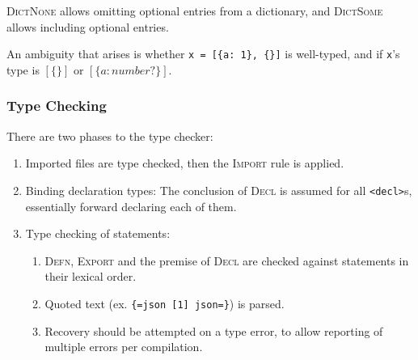 \begin{mathparpagebreakable}




\end{mathparpagebreakable}

\textsc{DictNone} allows omitting optional entries from a dictionary, and
\textsc{DictSome} allows including optional entries.

An ambiguity that arises is whether \texttt{x = [\{a: 1\}, \{\}]} is well-typed,
and if \texttt{x}'s type is $[\{\}]$ or $[\{ a: number? \}]$.

\subsubsection{Type Checking}

There are two phases to the type checker:

\begin{enumerate}
  \item Imported files are type checked, then the \textsc{Import}
        rule is applied.
  \item Binding declaration types: The conclusion of \textsc{Decl} is assumed
        for all \texttt{<decl>}s, essentially forward declaring each of them.
  \item Type checking of statements:
        \begin{enumerate}
          \item \textsc{Defn}, \textsc{Export} and the premise of \textsc{Decl}
                are checked against statements in their lexical order.
          \item Quoted text (ex. \texttt{\{=json [1] json=\}}) is parsed.
          \item Recovery should be attempted on a type error, to allow reporting
                of multiple errors per compilation.
        \end{enumerate}
\end{enumerate}

